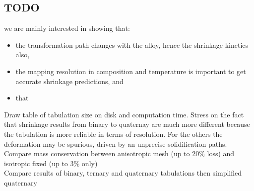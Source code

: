 \subsection{TODO}

we are mainly interested in showing that:
\begin{itemize}
\itemsep0em
\item  the transformation path changes with the alloy, hence the shrinkage kinetics also,
\item  the mapping resolution in composition and temperature is important to get accurate shrinkage predictions, and
\item  that 
\end{itemize}  


Draw table of tabulation size on disk and computation time. Stress on the fact that shrinkage results from binary to quaternay are much more different because
the tabulation is more reliable in terms of resolution. For the others the deformation may be spurious, driven by an unprecise solidification paths. \\
Compare mass conservation between anisotropic mesh (up to 20\% loss) and isotropic fixed (up to 3\% only) \\
Compare results of binary, ternary and quaternary tabulations then simplified quaternary \\
 




